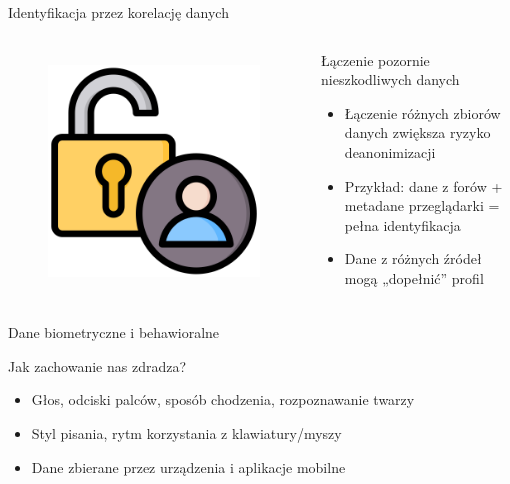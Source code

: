   \begin{frame}{Identyfikacja przez korelację danych}
  \begin{columns}[c]
      \begin{figure}
        \centering
        \includegraphics[height=0.45\textheight]{images/access-control.png}
        \label{fig:dataCorrelation}
      \end{figure}
      \begin{alertblock}{Łączenie pozornie nieszkodliwych danych}
        \begin{itemize}
          \item Łączenie różnych zbiorów danych zwiększa ryzyko deanonimizacji
          \item Przykład: dane z forów + metadane przeglądarki = pełna identyfikacja
          \item Dane z różnych źródeł mogą „dopełnić” profil
        \end{itemize}
      \end{alertblock}
  \end{columns}
  \end{frame}
  
  \begin{frame}{Dane biometryczne i behawioralne}
    \begin{alertblock}{Jak zachowanie nas zdradza?}
      \begin{itemize}
        \item Głos, odciski palców, sposób chodzenia, rozpoznawanie twarzy
        \item Styl pisania, rytm korzystania z klawiatury/myszy
        \item Dane zbierane przez urządzenia i aplikacje mobilne
      \end{itemize}
    \end{alertblock}
  \end{frame}
  
